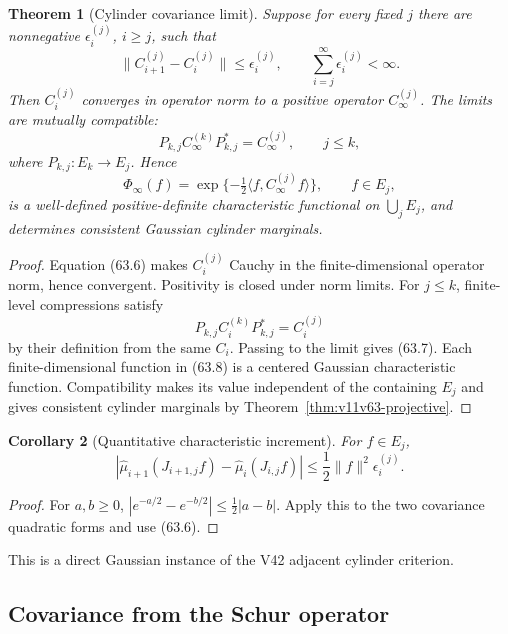 \documentclass[11pt]{article}
\newtheorem{theorem}{Theorem}[section]
\newtheorem{corollary}[theorem]{Corollary}
\begin{document}
\begin{theorem}[Cylinder covariance limit]
\label{thm:v11v63-defect}
Suppose for every fixed \(j\) there are nonnegative
\(\epsilon_i^{(j)}\), \(i\ge j\), such that
\[
 \lVert C_{i+1}^{(j)}-C_i^{(j)}\rVert
                       \le\epsilon_i^{(j)},\qquad
 \sum_{i=j}^{\infty}\epsilon_i^{(j)}<\infty.                 \tag{63.6}
\]
Then \(C_i^{(j)}\) converges in operator norm to a positive operator
\(C_\infty^{(j)}\).  The limits are mutually compatible:
\[
                         P_{k,j}C_\infty^{(k)}P_{k,j}^*
                              =C_\infty^{(j)},\qquad j\le k,   \tag{63.7}
\]
where \(P_{k,j}:E_k\to E_j\).  Hence
\[
 \Phi_\infty(f)
 =\exp\{-\tfrac12\langle f,C_\infty^{(j)}f\rangle\},
 \qquad f\in E_j,                                             \tag{63.8}
\]
is a well-defined positive-definite characteristic functional on
\(\bigcup_jE_j\), and determines consistent Gaussian cylinder
marginals.
\end{theorem}

\begin{proof}
Equation (63.6) makes \(C_i^{(j)}\) Cauchy in the finite-dimensional
operator norm, hence convergent.  Positivity is closed under norm
limits.  For \(j\le k\), finite-level compressions satisfy
\[
                 P_{k,j}C_i^{(k)}P_{k,j}^*=C_i^{(j)}
\]
by their definition from the same \(C_i\).  Passing to the limit gives
(63.7).  Each finite-dimensional function in (63.8) is a centered
Gaussian characteristic function.  Compatibility makes its value
independent of the containing \(E_j\) and gives consistent cylinder
marginals by Theorem~\ref{thm:v11v63-projective}.
\end{proof}

\begin{corollary}[Quantitative characteristic increment]
\label{cor:v11v63-characteristic}
For \(f\in E_j\),
\[
 |\widehat\mu_{i+1}(J_{i+1,j}f)
       -\widehat\mu_i(J_{i,j}f)|
 \le\frac12\lVert f\rVert^2\epsilon_i^{(j)}.                 \tag{63.9}
\]
\end{corollary}

\begin{proof}
For \(a,b\ge0\),
\(|e^{-a/2}-e^{-b/2}|\le\frac12|a-b|\).  Apply this to the two
covariance quadratic forms and use (63.6).
\end{proof}

This is a direct Gaussian instance of the V42 adjacent cylinder
criterion.

\subsection{Covariance from the Schur operator}
\end{document}
